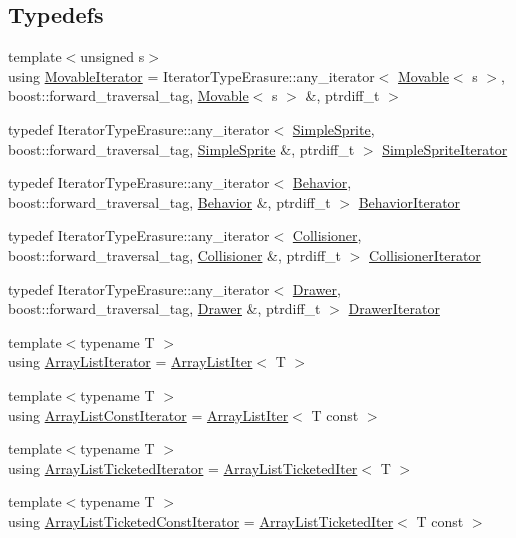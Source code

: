 \subsection*{Typedefs}
\begin{DoxyCompactItemize}
\item 
{\footnotesize template$<$unsigned s$>$ }\\using \hyperlink{namespacezbe_aac207741b7b7b641e92f8eac56a8fd88}{Movable\+Iterator} = Iterator\+Type\+Erasure\+::any\+\_\+iterator$<$ \hyperlink{classzbe_1_1_movable}{Movable}$<$ s $>$, boost\+::forward\+\_\+traversal\+\_\+tag, \hyperlink{classzbe_1_1_movable}{Movable}$<$ s $>$ \&, ptrdiff\+\_\+t $>$
\item 
typedef Iterator\+Type\+Erasure\+::any\+\_\+iterator$<$ \hyperlink{classzbe_1_1_simple_sprite}{Simple\+Sprite}, boost\+::forward\+\_\+traversal\+\_\+tag, \hyperlink{classzbe_1_1_simple_sprite}{Simple\+Sprite} \&, ptrdiff\+\_\+t $>$ \hyperlink{namespacezbe_aa6d4affc7b95360c2d43d5fde9837a1f}{Simple\+Sprite\+Iterator}
\item 
typedef Iterator\+Type\+Erasure\+::any\+\_\+iterator$<$ \hyperlink{classzbe_1_1_behavior}{Behavior}, boost\+::forward\+\_\+traversal\+\_\+tag, \hyperlink{classzbe_1_1_behavior}{Behavior} \&, ptrdiff\+\_\+t $>$ \hyperlink{namespacezbe_a98051e0b03810ff1bbe41c451aa7568e}{Behavior\+Iterator}
\item 
typedef Iterator\+Type\+Erasure\+::any\+\_\+iterator$<$ \hyperlink{classzbe_1_1_collisioner}{Collisioner}, boost\+::forward\+\_\+traversal\+\_\+tag, \hyperlink{classzbe_1_1_collisioner}{Collisioner} \&, ptrdiff\+\_\+t $>$ \hyperlink{namespacezbe_a38ddb97c007548db7c49a709eafb7b2e}{Collisioner\+Iterator}
\item 
typedef Iterator\+Type\+Erasure\+::any\+\_\+iterator$<$ \hyperlink{classzbe_1_1_drawer}{Drawer}, boost\+::forward\+\_\+traversal\+\_\+tag, \hyperlink{classzbe_1_1_drawer}{Drawer} \&, ptrdiff\+\_\+t $>$ \hyperlink{namespacezbe_a5d3dda3dc1f2ee13116b4c5958a47f2f}{Drawer\+Iterator}
\item 
{\footnotesize template$<$typename T $>$ }\\using \hyperlink{namespacezbe_af0d8ed46769e5212c0baa5ae5190e604}{Array\+List\+Iterator} = \hyperlink{classzbe_1_1_array_list_iter}{Array\+List\+Iter}$<$ T $>$
\item 
{\footnotesize template$<$typename T $>$ }\\using \hyperlink{namespacezbe_ad150b3b2832337d2dce4e58c3fe7da58}{Array\+List\+Const\+Iterator} = \hyperlink{classzbe_1_1_array_list_iter}{Array\+List\+Iter}$<$ T const  $>$
\item 
{\footnotesize template$<$typename T $>$ }\\using \hyperlink{namespacezbe_a1675a0090f0cdd995282757bb5f5bdbe}{Array\+List\+Ticketed\+Iterator} = \hyperlink{classzbe_1_1_array_list_ticketed_iter}{Array\+List\+Ticketed\+Iter}$<$ T $>$
\item 
{\footnotesize template$<$typename T $>$ }\\using \hyperlink{namespacezbe_afa10c72425dcc83afff52e7f290a1aee}{Array\+List\+Ticketed\+Const\+Iterator} = \hyperlink{classzbe_1_1_array_list_ticketed_iter}{Array\+List\+Ticketed\+Iter}$<$ T const  $>$
\end{DoxyCompactItemize}
